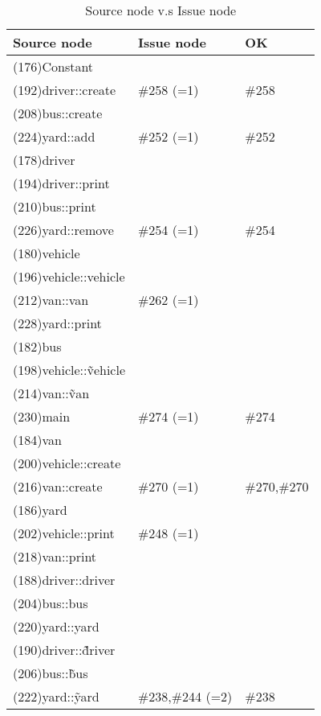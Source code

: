 \begin{table}[hb]
\begin{center}
\begin{tabular}{|l|l|l|}
\hline
Source node & Issue node & OK\\
\hline
(176)Constant & &\\
(192)driver::create & \#258 (=1) & \#258\\
(208)bus::create & &\\
(224)yard::add & \#252 (=1) & \#252\\
(178)driver & & \\
(194)driver::print & & \\
(210)bus::print & &\\
(226)yard::remove & \#254 (=1) & \#254\\
(180)vehicle & & \\
(196)vehicle::vehicle & &\\
(212)van::van & \#262 (=1) & \\
(228)yard::print & & \\
(182)bus & & \\
(198)vehicle::\~vehicle & & \\
(214)van::\~van & &\\
(230)main & \#274 (=1) & \#274\\
(184)van & & \\
(200)vehicle::create & & \\
(216)van::create & \#270 (=1) & \#270,\#270\\
(186)yard & \\
(202)vehicle::print & \#248 (=1) &\\
(218)van::print & &\\
(188)driver::driver & & \\
(204)bus::bus & &\\
(220)yard::yard & & \\
(190)driver::\~driver & & \\
(206)bus::\~bus & & \\
(222)yard::\~yard & \#238,\#244 (=2) & \#238\\
\hline
\end{tabular}
\caption{Source node v.s Issue node}
\end{center}
\end{table}

